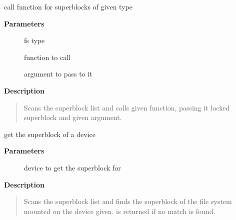 \documentclass[a4paper,8pt,english]{sphinxmanual}
\begin{document}
\begin{fulllineitems}
\label{filesystems/index:c.iterate_supers_type}
call function for superblocks of given type

\end{fulllineitems}


\textbf{Parameters}
\begin{description}
\item[{}] \leavevmode
fs type

\item[{}] \leavevmode
function to call

\item[{}] \leavevmode
argument to pass to it

\end{description}

\textbf{Description}
\begin{quote}

Scans the superblock list and calls given function, passing it
locked superblock and given argument.
\end{quote}

\begin{fulllineitems}
\label{filesystems/index:c.get_super}
get the superblock of a device

\end{fulllineitems}


\textbf{Parameters}
\begin{description}
\item[{}] \leavevmode
device to get the superblock for

\end{description}

\textbf{Description}
\begin{quote}

Scans the superblock list and finds the superblock of the file system
mounted on the device given.  is returned if no match is found.
\end{quote}
\end{document}
